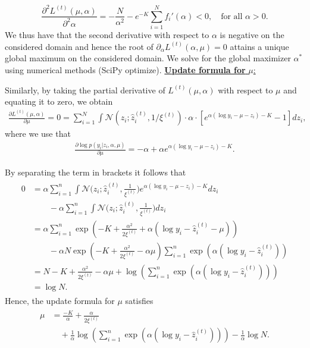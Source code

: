\begin{equation}
\frac{ \partial^2 L^{(t)}(\mu, \alpha)}{\partial^2 \alpha} = -\frac{N}{\alpha^2} - e^{-K} \sum_{i=1}^{N}f_i'(\alpha) < 0, \quad \mbox{for all } \alpha > 0.
\end{equation}
We thus have that the second derivative with respect to $\alpha$ is negative on the considered domain and hence the root of $\partial_{\alpha}L^{(t)}(\alpha, \mu) = 0$ attains a unique global maximum on the considered domain. We solve for the global maximizer $\alpha^*$ using numerical methods (SciPy optimize).
\newline
\newline
\noindent \underline{\textbf{Update formula for} $\mu$:} 
\newline 

\noindent Similarly, by taking the partial derivative of $L^{(t)}(\mu, \alpha)$ with respect to $\mu$ and equating it to zero, we obtain
\begin{align}
    \frac{\partial L^{(t)}(\mu, \alpha)}{\partial \mu} = 0 = \sum_{i=1}^N \int \mathcal{N}(z_i; \hat{z}_i^{(t)}, 1 / \xi^{(t)}) \cdot \alpha \cdot  [ e^{\alpha(\log y_i - \mu - z_i) - K} - 1] dz_i, 
\end{align}
where we use that 
\begin{align}
\frac{\partial \log p(y_i|z_i, \alpha, \mu)}{\partial \mu}= -\alpha + \alpha e^{\alpha(\log y_i - \mu - z_i) - K}.
\end{align}

By separating the term in brackets it follows that
\begin{align}
    \begin{split}
0 & = \alpha \sum_{i=1}^{n} \int \mathcal{N} \bigg (z_i; \hat{z}_i^{(t)}, \frac{1}{\xi^{(t)}} \bigg ) e^{\alpha(\log y_i - \mu - z_i) - K} dz_i \\
& \qquad - \alpha \sum_{i=1}^{n} \int \mathcal{N} \bigg (z_i; \hat{z}_i^{(t)}, \frac{1}{\xi^{(t)}} \bigg ) dz_i \\
& = \alpha \sum_{i=1}^{n} \exp \left( -K + \frac{\alpha^2}{2 \xi^{(t)}} + \alpha (\log y_i - \hat{z}_i^{(t)} - \mu) \right) \\
& \qquad - \alpha N \exp \left( -K + \frac{\alpha^2}{2 \xi^{(t)}} - \alpha \mu \right) \sum_{i=1}^{n} \exp \left( \alpha (\log y_i - \hat{z}_i^{(t)}) \right) \\
& = N -K + \frac{\alpha^2}{2 \xi^{(t)}} - \alpha \mu + \log \left( \sum_{i=1}^{n} \exp \left( \alpha (\log y_i - \hat{z}_i^{(t)}) \right) \right) \\
& = \log N.
    \end{split}
\end{align}
Hence, the update formula for $\mu$ satisfies
\begin{align}
\begin{split}
\mu & = \frac{-K}{\alpha} + \frac{\alpha}{2 \xi^{(t)}} \\
& \quad + \frac{1}{\alpha} \log \left( \sum_{i=1}^{n} \exp \left( \alpha (\log y_i - \hat{z}_i^{(t)}) \right) \right) - \frac{1}{\alpha} \log N.
\end{split}
\end{align}

